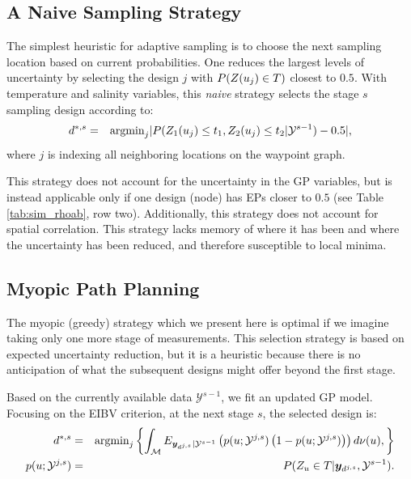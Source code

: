 \documentclass[aoas]{imsart}
\begin{document}
 
\subsection{A Naive Sampling Strategy}
\label{naive}

The simplest heuristic for adaptive sampling is to choose the next
sampling location based on current probabilities. One reduces the
largest levels of uncertainty by selecting the design $j$ with
$P(Z(u_j) \in T)$ closest to $0.5$.  With temperature and salinity
variables, this {\it{naive}} strategy selects the stage $s$ sampling
design according to:
\begin{eqnarray}\label{critNaive}
    d^{*,s} &=& \mbox{argmin}_{j} |P(Z_1(\x_j) \leq t_1, Z_2(\x_j) \leq t_2 | \mathcal{Y}^{s-1})-0.5|, \nonumber
\end{eqnarray}
where $j$ is indexing all neighboring locations on the waypoint graph.

This strategy does not account for the uncertainty in the GP
variables, but is instead applicable only if one design (node) has EPs
closer to $0.5$ (see Table \ref{tab:sim_rhoab}, row
two). Additionally, this strategy does not account for spatial
correlation. This strategy lacks memory of where it has been and where
the uncertainty has been reduced, and therefore susceptible to local
minima.

\subsection{Myopic Path Planning}
\label{sec:myopic}

The myopic (greedy) strategy which we present here is optimal if we
imagine taking only one more stage of measurements. This selection
strategy is based on expected uncertainty reduction, but it is a
heuristic because there is no anticipation of what the subsequent
designs might offer beyond the first stage.

Based on the currently available data $\mathcal{Y}^{s-1}$, we fit an
updated GP model. Focusing on the EIBV criterion, at the next stage
$s$, the selected design is:
\begin{eqnarray}\label{critSEQ}
    d^{*,s} &=& \mbox{argmin}_{j} \left\{ \int_{\mathcal{M}} E_{\by_{d^{j,s}}|\mathcal{Y}^{s-1}} \left( p(\x;\mathcal{Y}^{j,s})\left( 1-p(\x;\mathcal{Y}^{j,s})\right) \right) d\mes(u), \right\} \\
    p(\x;\mathcal{Y}^{j,s}) &=& P(Z_u \in T |\by_{d^{j,s}},\mathcal{Y}^{s-1}). \nonumber
\end{eqnarray}
\end{document}

